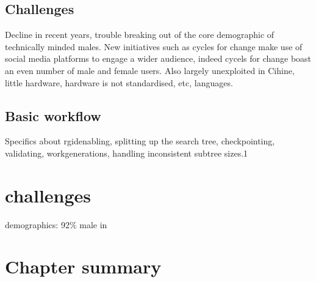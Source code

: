 \subsection{Challenges}
Decline in recent years, trouble breaking out of the core demographic of technically minded males. New initiatives such as cycles for change make use of social media platforms to engage a wider audience, indeed cycels for change boast an even number of male and female users. Also largely unexploited in Cihine, little hardware, hardware is not standardised, etc, languages.

\subsection{Basic workflow}

 
Specifics about rgidenabling, splitting up the search tree,  checkpointing, validating, workgenerations, handling inconsistent subtree sizes.1


\section{challenges}
demographics: 92\% male in \cite{anderson:pc}



\section{Chapter summary}
